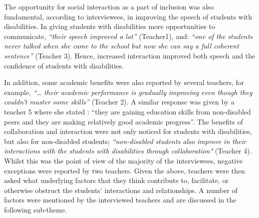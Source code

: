\documentclass[11pt]{sig-alternate}
\begin{document}
\begin{large}
{The opportunity for social interaction as a part of inclusion was also fundamental, according to interviewees, in improving the speech of students with disabilities. In giving students with disabilities more opportunities to communicate, \textit{“their speech improved a lot”} (Teacher1), and: \textit{“one of the students never talked when she came to the school but now she can say a full coherent sentence”} (Teacher 3). Hence, increased interaction improved both speech and the confidence of students with disabilities. 

 In addition, some academic benefits were also reported by several teachers, for example, \textit{“… their academic performance is gradually improving even though they couldn’t master some skills”} (Teacher 2). A similar response was given by a teacher 5 where she stated : “they are gaining education skills from non-disabled peers and they are making relatively good academic progress”. The benefits of collaboration and interaction were not only noticed for students with disabilities, but also for non-disabled students; \textit{“non-disabled students also improve in their interactions with the students with disabilities through collaboration"} (Teacher 4). Whilst this was the point of view of the majority of the interviewees, negative exceptions were reported by two teachers. Given the above, teachers were then asked what underlying factors that they think contribute to, facilitate, or otherwise obstruct the students’ interactions and relationships. A number of factors were mentioned by the interviewed teachers and are discussed in the following sub-theme.   

}
\end{large}
\end{document}
